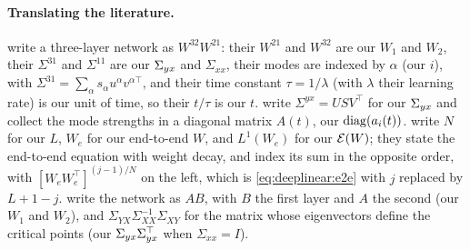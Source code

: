 \begin{refsection}
\paragraph{Translating the literature.} \Textcite{SaxeEtAl2014} write a three-layer network as $W^{32}W^{21}$: their $W^{21}$ and $W^{32}$ are our $W_1$ and $W_2$, their $\Sigma^{31}$ and $\Sigma^{11}$ are our $\Sigma_{yx}$ and $\Sigma_{xx}$, their modes are indexed by $\alpha$ (our $i$), with $\Sigma^{31}=\sum_\alpha s_\alpha u^\alpha v^{\alpha\top}$, and their time constant $\tau=1/\lambda$ (with $\lambda$ their learning rate) is our unit of time, so their $t/\tau$ is our $t$. \Textcite{SaxeEtAl2019} write $\Sigma^{yx}=USV^\top$ for our $\Sigma_{yx}$ and collect the mode strengths in a diagonal matrix $A(t)$, our $\operatorname{diag}(a_i(t))$. \Textcite{AroraCohenHazan2018} write $N$ for our $L$, $W_e$ for our end-to-end $W$, and $L^1(W_e)$ for our $\mathcal{E}(W)$; they state the end-to-end equation with weight decay, and index its sum in the opposite order, with $[W_eW_e^\top]^{(j-1)/N}$ on the left, which is \eqref{eq:deeplinear:e2e} with $j$ replaced by $L+1-j$. \Textcite{BaldiHornik1989} write the network as $AB$, with $B$ the first layer and $A$ the second (our $W_1$ and $W_2$), and $\Sigma_{YX}\Sigma_{XX}^{-1}\Sigma_{XY}$ for the matrix whose eigenvectors define the critical points (our $\Sigma_{yx}\Sigma_{yx}^\top$ when $\Sigma_{xx}=I$).

\printchapterbib
\end{refsection}
